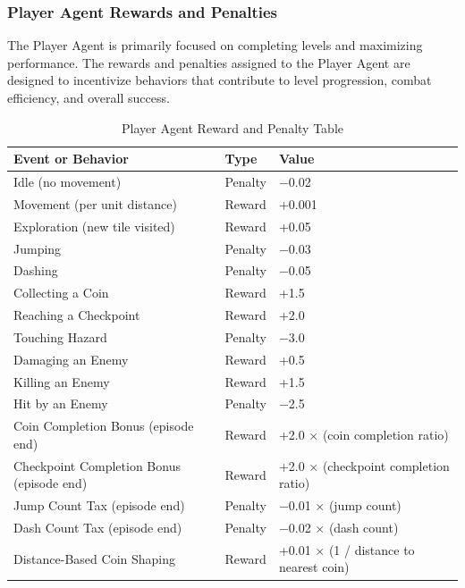 \documentclass[12pt,oneside,openright,a4paper]{cpe-english-project}
\begin{document}
\subsubsection{Player Agent Rewards and Penalties}
The Player Agent is primarily focused on completing levels and maximizing performance. The rewards and penalties assigned to the Player Agent are designed to incentivize behaviors that contribute to level progression, combat efficiency, and overall success.\par
\begin{table}[H]
\caption{Player Agent Reward and Penalty Table}
\label{tbl:PlayerAgentRewardPenaltyTable}
\begin{tabular}{|l|l|l|}
\hline
\textbf{Event or Behavior} & \textbf{Type} & \textbf{Value} \\
\hline
Idle (no movement) & Penalty & −0.02 \\
Movement (per unit distance) & Reward & +0.001 \\
Exploration (new tile visited) & Reward & +0.05 \\
Jumping & Penalty & −0.03 \\
Dashing & Penalty & −0.05 \\
Collecting a Coin & Reward & +1.5 \\
Reaching a Checkpoint & Reward & +2.0 \\
Touching Hazard & Penalty & −3.0 \\
Damaging an Enemy & Reward & +0.5 \\
Killing an Enemy & Reward & +1.5 \\
Hit by an Enemy & Penalty & −2.5 \\
Coin Completion Bonus (episode end) & Reward & +2.0 × (coin completion ratio) \\
Checkpoint Completion Bonus (episode end) & Reward & +2.0 × (checkpoint completion ratio) \\
Jump Count Tax (episode end) & Penalty & −0.01 × (jump count) \\
Dash Count Tax (episode end) & Penalty & −0.02 × (dash count) \\
Distance-Based Coin Shaping & Reward & +0.01 × (1 / distance to nearest coin) \\
\hline
\end{tabular}
\end{table}
\end{document}
